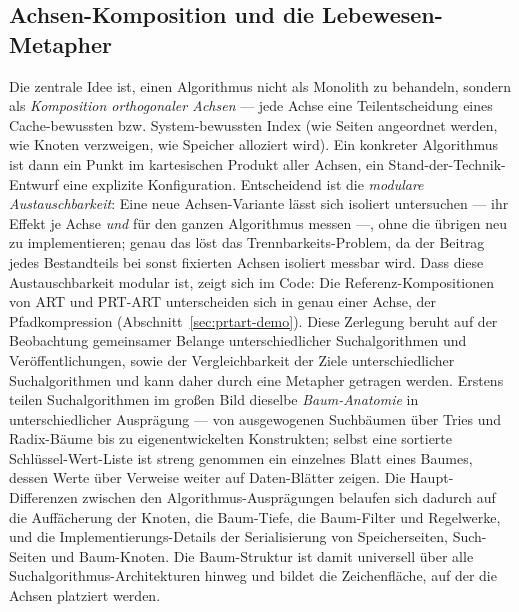 \begin{nurlang}
\subsection{Achsen-Komposition und die Lebewesen-Metapher}\label{sec:anatomy-metaphor}
Die zentrale Idee ist, einen Algorithmus nicht als Monolith zu behandeln, sondern als \emph{Komposition
orthogonaler Achsen} --- jede Achse eine Teilentscheidung eines Cache-bewussten bzw. System-bewussten Index (wie Seiten
angeordnet werden, wie Knoten verzweigen, wie Speicher alloziert wird). Ein konkreter Algorithmus ist dann
ein Punkt im kartesischen Produkt aller Achsen, ein Stand-der-Technik-Entwurf eine explizite
Konfiguration. Entscheidend ist die \emph{modulare Austauschbarkeit}: Eine neue Achsen-Variante lässt sich
isoliert untersuchen --- ihr Effekt je Achse \emph{und} für den ganzen Algorithmus messen ---, ohne die
übrigen neu zu implementieren; genau das löst das Trennbarkeits-Problem, da der Beitrag jedes Bestandteils
bei sonst fixierten Achsen isoliert messbar wird. Dass diese Austauschbarkeit modular ist, zeigt sich im
Code: Die Referenz-Kompositionen von ART und PRT-ART unterscheiden sich in genau einer Achse, der
Pfadkompression (Abschnitt~\ref{sec:prtart-demo}). Diese Zerlegung beruht auf der Beobachtung gemeinsamer Belange unterschiedlicher Suchalgorithmen und Veröffentlichungen, sowie der Vergleichbarkeit der Ziele unterschiedlicher Suchalgorithmen und kann daher durch eine Metapher getragen werden. Erstens
teilen Suchalgorithmen im großen Bild dieselbe \emph{Baum-Anatomie} in unterschiedlicher Ausprägung ---
von ausgewogenen Suchbäumen über Tries und Radix-Bäume bis zu eigenentwickelten Konstrukten; selbst eine
sortierte Schlüssel-Wert-Liste ist streng genommen ein einzelnes Blatt eines Baumes, dessen Werte über
Verweise weiter auf Daten-Blätter zeigen. Die Haupt-Differenzen zwischen den Algorithmus-Ausprägungen belaufen sich dadurch auf die Auffächerung der Knoten, die Baum-Tiefe, die Baum-Filter und Regelwerke, und die Implementierungs-Details der Serialisierung von Speicherseiten, Such-Seiten und Baum-Knoten. Die Baum-Struktur ist damit universell über alle Suchalgorithmus-Architekturen hinweg und bildet die Zeichenfläche, auf der die Achsen platziert werden.
\end{nurlang}
